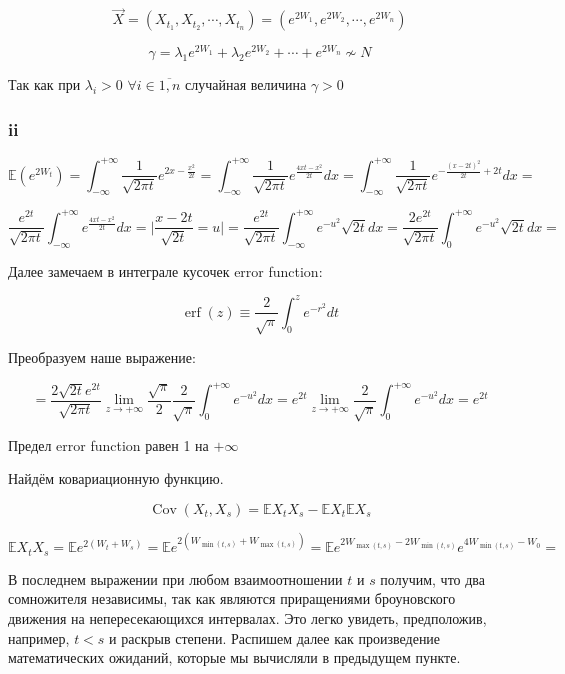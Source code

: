 \documentclass[a4paper,12pt]{article}
\def \mbb{\mathbb}
\def \cov{{\operatorname{Cov}}}
\def \E{\mbb{E}}
\begin{document}
 \[ \vec{X} = \left( X_{t_1}, X_{t_2}, \cdots, X_{t_n} \right) = \left( e^{2W_1}, e^{2W_2}, \cdots, e^{2W_n} \right)  \]
 
 \[ \gamma =  \lambda_1 e^{2W_1} + \lambda_2 e^{2W_2} + \cdots +  e^{2W_n} \not\sim N \]
 
Так как при $ \lambda_i > 0$ $ \forall i \in \overline{1,n} $  случайная величина $ \gamma > 0 $

\subsubsection{ii}

\[ \E(e^{2W_t})  = \int_{-\infty}^{+\infty} \frac{1}{\sqrt{2\pi t}}  e^{2x - \frac{x^2}{2t}} = \int_{-\infty}^{+\infty} \frac{1}{\sqrt{2\pi t}}  e^{\frac{4xt - x^2}{2t}} dx = \int_{-\infty}^{+\infty} \frac{1}{\sqrt{2\pi t}}  e^{-\frac{(x-2t)^2}{2t} + 2t} dx = \]

\[ \frac{e^{2t}}{\sqrt{2\pi t}}  \int_{-\infty}^{+\infty}   e^{\frac{4xt - x^2}{2t}} dx = \Biggr| \frac{x - 2t}{\sqrt{2t}} = u \Biggr| =  \frac{e^{2t}}{\sqrt{2\pi t}}  \int_{-\infty}^{+\infty}  e^{-u^2}  \sqrt{2t}  dx = \frac{2 e^{2t}}{\sqrt{2\pi t}}  \int_{0}^{+\infty}  e^{-u^2}  \sqrt{2t}  dx = \]

Далее замечаем в интеграле кусочек error function:

\[
\operatorname{erf}(z) \equiv \frac{2}{\sqrt{\pi}} \int_{0}^{z} e^{-r^{2}} d t
\]

Преобразуем наше выражение:

\[ =  \frac{2 \sqrt{2t} e^{2t}}{\sqrt{2\pi t}}  \lim\limits_{z \to +\infty} \frac{\sqrt{\pi}}{2} \frac{2}{\sqrt{\pi}} \int_{0}^{+\infty} e^{-u^2}   dx = e^{2t} \lim\limits_{z \to +\infty}  \frac{2}{\sqrt{\pi}} \int_{0}^{+\infty} e^{-u^2}   dx = e^{2t} \]

Предел error function равен 1 на $ +\infty $

Найдём ковариационную функцию.

\[ \cov(X_t, X_s) = \E X_t X_s - \E X_t\E X_s \]

\[ \E X_t X_s = \E e^{2(W_t + W_s)} = \E e^{2(W_{\min(t,s)} + W_{\max(t,s)})} = \E e^{2 W_{\max(t,s)} - 2 W_{\min(t,s)}} e^{4 W_{\min(t,s)} - W_0} = \]

В последнем выражении при любом взаимоотношении $ t $ и $ s $ получим, что два сомножителя независимы, так как являются приращениями броуновского движения на непересекающихся интервалах. Это легко увидеть, предположив, например, $ t < s $  и раскрыв степени. Распишем далее как произведение математических ожиданий, которые мы вычисляли в предыдущем пункте.
\end{document}

